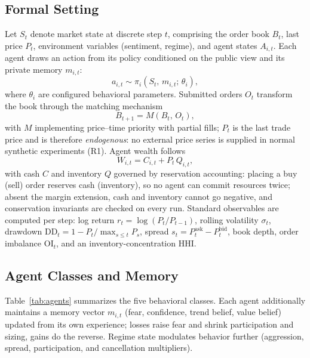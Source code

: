 \documentclass[conference]{IEEEtran}
\begin{document}
\subsection{Formal Setting}
Let $S_t$ denote market state at discrete step $t$, comprising the
order book $B_t$, last price $P_t$, environment variables (sentiment,
regime), and agent states $A_{i,t}$. Each agent draws an action from
its policy conditioned on the public view and its private memory
$m_{i,t}$:
\begin{equation}
a_{i,t} \sim \pi_i\!\left(S_t,\, m_{i,t};\, \theta_i\right),
\end{equation}
where $\theta_i$ are configured behavioral parameters. Submitted
orders $O_t$ transform the book through the matching mechanism
\begin{equation}
B_{t+1} = M\!\left(B_t,\, O_t\right),
\end{equation}
with $M$ implementing price--time priority with partial fills; $P_t$
is the last trade price and is therefore \emph{endogenous}: no external
price series is supplied in normal synthetic experiments (R1). Agent
wealth follows
\begin{equation}
W_{i,t} = C_{i,t} + P_t\, Q_{i,t},
\end{equation}
with cash $C$ and inventory $Q$ governed by reservation accounting:
placing a buy (sell) order reserves cash (inventory), so no agent can
commit resources twice; absent the margin extension, cash and inventory
cannot go negative, and conservation invariants are checked on every
run. Standard observables are computed per step: log return
$r_t = \log(P_t/P_{t-1})$, rolling volatility $\sigma_t$, drawdown
$\mathrm{DD}_t = 1 - P_t/\max_{s\le t}P_s$, spread
$s_t = P^{\mathrm{ask}}_t - P^{\mathrm{bid}}_t$, book depth, order
imbalance $\mathrm{OI}_t$, and an inventory-concentration HHI.

\subsection{Agent Classes and Memory}
Table~\ref{tab:agents} summarizes the five behavioral classes. Each
agent additionally maintains a memory vector $m_{i,t}$ (fear,
confidence, trend belief, value belief) updated from its own
experience; losses raise fear and shrink participation and sizing,
gains do the reverse. Regime state modulates behavior further
(aggression, spread, participation, and cancellation multipliers).
\end{document}
